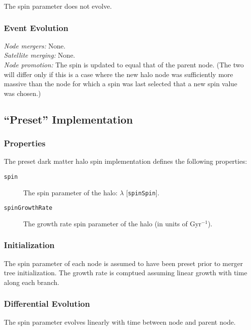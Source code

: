 The spin parameter does not evolve.

\subsubsection{Event Evolution}

\noindent\emph{Node mergers:} None.\\

\noindent\emph{Satellite merging:} None.\\

\noindent\emph{Node promotion:} The spin is updated to equal that of the parent node. (The two will differ only if this is a case where the new halo \gls{node} was sufficiently more massive than the \gls{node} for which a spin was last selected that a new spin value was chosen.)\\

\subsection{``Preset'' Implementation}

\subsubsection{Properties}

The preset dark matter halo spin implementation defines the following properties:
\begin{description}
 \item [{\tt spin}] The spin parameter of the halo: $\lambda$ [{\tt spinSpin}].
 \item [{\tt spinGrowthRate}] The growth rate spin parameter of the halo (in units of Gyr$^{-1}$).
\end{description}

\subsubsection{Initialization}

The spin parameter of each \gls{node} is assumed to have been preset prior to merger tree initialization. The growth rate is comptued assuming linear growth with time along each branch.

\subsubsection{Differential Evolution}

The spin parameter evolves linearly with time between \gls{node} and parent node.


